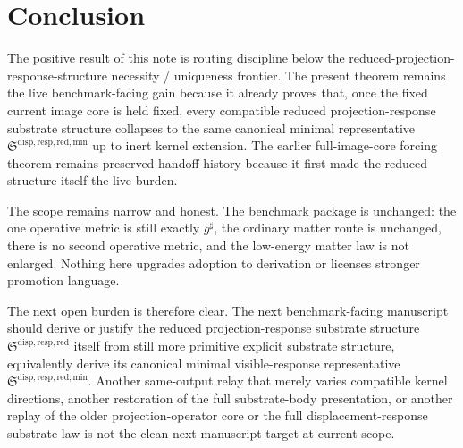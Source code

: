 \documentclass[11pt]{article}
\newcommand{\CompletedMetric}{g^{\sharp}}
\newcommand{\ReducedStructure}{\mathfrak S^{\mathrm{disp,resp,red}}}
\newcommand{\MinimalReducedStructure}{\mathfrak S^{\mathrm{disp,resp,red,min}}}
\begin{document}
\section{Conclusion}

The positive result of this note is routing discipline below the reduced-projection-response-structure necessity / uniqueness frontier. The present theorem remains the live benchmark-facing gain because it already proves that, once the fixed current image core is held fixed, every compatible reduced projection-response substrate structure collapses to the same canonical minimal representative \(\MinimalReducedStructure\) up to inert kernel extension. The earlier full-image-core forcing theorem remains preserved handoff history because it first made the reduced structure itself the live burden.

The scope remains narrow and honest. The benchmark package is unchanged: the one operative metric is still exactly \(\CompletedMetric\), the ordinary matter route is unchanged, there is no second operative metric, and the low-energy matter law is not enlarged. Nothing here upgrades adoption to derivation or licenses stronger promotion language.

The next open burden is therefore clear. The next benchmark-facing manuscript should derive or justify the reduced projection-response substrate structure \(\ReducedStructure\) itself from still more primitive explicit substrate structure, equivalently derive its canonical minimal visible-response representative \(\MinimalReducedStructure\). Another same-output relay that merely varies compatible kernel directions, another restoration of the full substrate-body presentation, or another replay of the older projection-operator core or the full displacement-response substrate law is not the clean next manuscript target at current scope.
\end{document}
